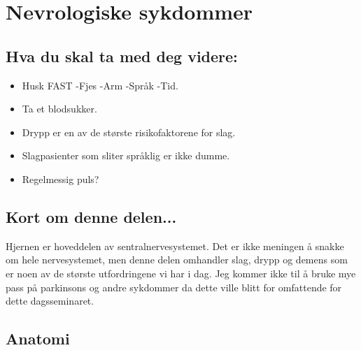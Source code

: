  \chapter{Nevrologiske sykdommer}
		\section{Hva du skal ta med deg videre:}
			\begin{itemize}
				\item Husk FAST -Fjes -Arm -Språk -Tid.\\
				\item Ta et blodsukker.\\
				\item Drypp er en av de største risikofaktorene for slag.\\
				\item Slagpasienter som sliter språklig er ikke dumme.\\
				\item Regelmessig puls?\\
			\end{itemize}
		\section{Kort om denne delen...}
			Hjernen er hoveddelen av sentralnervesystemet. Det er ikke meningen å snakke om hele nervesystemet, men denne delen omhandler slag, drypp og demens som er noen av de største utfordringene vi har i dag. Jeg kommer ikke til å bruke mye pass på parkinsons og andre sykdommer da dette ville blitt for omfattende for dette dagsseminaret.
		\section{Anatomi}
